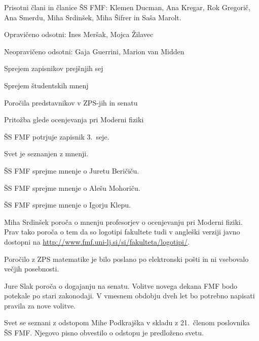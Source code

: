 \documentclass{seja}
\begin{document}
Prisotni člani in članice ŠS FMF: Klemen Ducman, Ana Kregar, Rok Gregorič, Ana Smerdu, Miha Srdinšek, Miha Šifrer in Saša Marolt.

Opravičeno odsotni: Ines Meršak, Mojca Žilavec

Neopravičeno odsotni: Gaja Guerrini, Marion van Midden

\begin{red*}
\item Sprejem zapisnikov prejšnjih sej
\item Sprejem študentskih mnenj
\item Poročila predstavnikov v ZPS-jih in senatu
\item Pritožba glede ocenjevanja pri Moderni fiziki
\end{red*}

\begin{ad}
\item
\begin{sklep*}
  ŠS FMF potrjuje zapisnik 3.~seje.
\end{sklep*}

\item
Svet je seznanjen z mnenji.

\begin{sklep*} ŠS FMF sprejme mnenje o Juretu Beričiču.  \end{sklep*}
\begin{sklep*} ŠS FMF sprejme mnenje o Alešu Mohoriču. \end{sklep*}
\begin{sklep*} ŠS FMF sprejme mnenje o Igorju Klepu. \end{sklep*}

\item Miha Srdinšek poroča o mnenju profesorjev o ocenjevanju pri Moderni fiziki.
Prav tako poroča o tem da so logotipi fakultete tudi v angleški verziji javno dostopni na
\url{http://www.fmf.uni-lj.si/si/fakulteta/logotipi/}.

Poročilo z ZPS matematike je bilo poslano po elektronski pošti in ni vsebovalo večjih posebnosti.

Jure Slak poroča o dogajanju na senatu. Volitve novega dekana FMF bodo potekale po stari zakonodaji.
V vmesnem obdobju dveh let bo potrebno napisati pravila za nove volitve.

\item Svet se seznani z odstopom Mihe Podkrajška v skladu z 21.~členom poslovnika ŠS FMF.
Njegovo pisno obvestilo o odstopu je predloženo svetu.


\end{ad}
\end{document}
